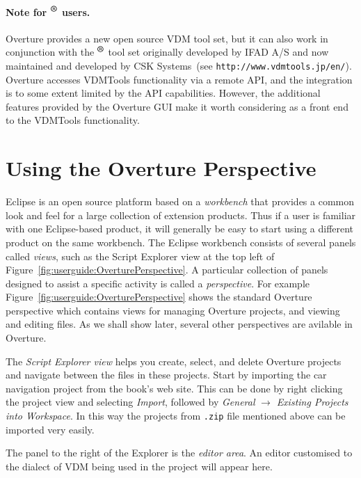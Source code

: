 \paragraph{Note for \vdmtools$^{\mbox{\small\textbf{{\textregistered}}}}$ users.} 
Overture provides a new open source VDM tool set, but it can also work
in conjunction with the
\vdmtools$^{\mbox{\small\textbf{{\textregistered}}}}$
tool set originally developed by IFAD A/S and now maintained and
developed by CSK Systems~(see
\texttt{http://www.vdmtools.jp/en/}). Overture accesses VDMTools
functionality via a remote API, and the integration is to some extent
limited by the API capabilities. However, the additional features
provided by the Overture GUI make it worth considering as a front end
to the VDMTools functionality.
 
\section{Using the Overture Perspective}\label{sec:vdmsupport}

Eclipse is an open source platform based on a \emph{workbench} that
provides a common look and feel for a large collection of extension
products. Thus if a user is familiar with one Eclipse-based product,
it will generally be easy to start using a different product on the
same workbench. The Eclipse workbench consists of several panels
called \emph{views}, such as the Script Explorer view at the top left
of Figure~\ref{fig:userguide:OverturePerspective}. A particular
collection of panels designed to assist a specific activity is called a
\emph{perspective}. For example
Figure~\ref{fig:userguide:OverturePerspective} shows the standard
Overture perspective which contains views for managing Overture
projects, and viewing and editing files. As we shall show later,
several other perspectives are avilable in Overture.

The \emph{Script Explorer view} helps you create, select, and delete
Overture projects and navigate between the files in these
projects. Start by importing the car navigation project from the
book's web site. This can be done by right clicking the project view
and selecting \emph{Import}, followed by \emph{General} $\rightarrow$
\emph{Existing Projects into Workspace}.  In this way the projects
from \texttt{.zip} file mentioned above can be imported very easily.

The panel to the right of the Explorer is the \emph{editor area}. An
editor customised to the dialect of VDM being used in the project will
appear here.

